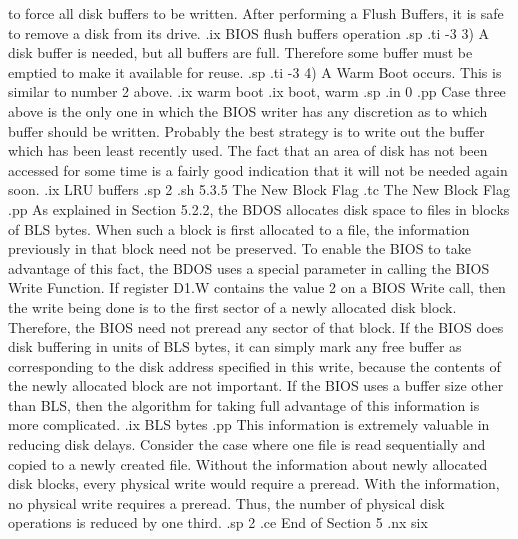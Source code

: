 to force all disk buffers to be written.  After performing a Flush Buffers, 
it is safe to remove a disk from its drive.
.ix BIOS flush buffers operation
.sp
.ti -3
3) A disk buffer is needed, but all buffers are full.  Therefore some
buffer must be emptied to make it available for reuse.
.sp
.ti -3
4) A Warm Boot occurs.  This is similar to number 2 above.
.ix warm boot
.ix boot, warm
.sp
.in 0
.pp
Case three above is the only one in which the BIOS writer has any discretion
as to which buffer should be written.  Probably the best strategy is to 
write out the buffer which has been least recently used.  The fact that
an area of disk has not been accessed for some time is a fairly good 
indication that it will not be needed again soon.  
.ix LRU buffers
.sp 2
.sh
5.3.5  The New Block Flag
.tc         The New Block Flag
.pp
As explained in Section 5.2.2, the BDOS allocates disk space to files
in blocks of BLS bytes.  When such a block is first allocated to a file,
the information previously in that block need not be preserved.  To
enable the BIOS to take advantage of this fact, the BDOS uses a special
parameter in calling the BIOS Write Function.  If register D1.W contains
the value 2 on a BIOS Write call, then the write being done is to the
first sector of a newly allocated disk block.  Therefore, the BIOS need
not preread any sector of that block.  If the BIOS does disk buffering
in units of BLS bytes, it can simply mark any free buffer as corresponding
to the disk address specified in this write, because the contents of the 
newly allocated block are not important.  If the BIOS uses a buffer size
other than BLS, then the algorithm for taking full advantage of this
information is more complicated.  
.ix BLS bytes
.pp
This information is extremely valuable in reducing disk delays.  Consider
the case where one file is read sequentially and copied to a newly created
file.  Without the information about newly allocated disk blocks, every 
physical write would require a preread.  With the information, 
no physical write requires a preread.  Thus, the number of physical disk
operations is reduced by one third.
.sp 2
.ce
End of Section 5
.nx six

 
